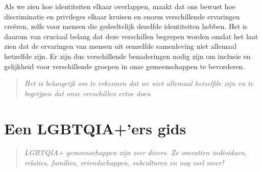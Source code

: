 \documentclass[12pt,openany]{book}
\begin{document}
Als we zien hoe identiteiten elkaar overlappen, maakt dat ons bewust hoe discriminatie en privileges elkaar kruisen en enorm verschillende ervaringen creëren, zelfs voor mensen die gedeeltelijk dezelfde identiteiten hebben. Het is daarom van cruciaal belang dat deze verschillen begrepen worden omdat het laat zien dat de ervaringen van mensen uit eenzelfde samenleving niet allemaal hetzelfde zijn. Er zijn dus verschillende benaderingen nodig zijn om inclusie en gelijkheid voor verschillende groepen in onze gemeenschappen te bevorderen.

\begin{quote}
\textit{Het is belangrijk om te erkennen dat we niet allemaal hetzelfde zijn en te begrijpen dat onze verschillen ertoe doen}
\end{quote}

\begin{figure}[h]
    \centering
\end{figure}

\chapter*{Een LGBTQIA+’ers gids}

\begin{quote}
\textit{LGBTQIA+ gemeenschappen zijn zeer divers. Ze omvatten individuen, relaties, families, vriendschappen, subculturen en nog veel meer!}
\end{quote}
\end{document}
